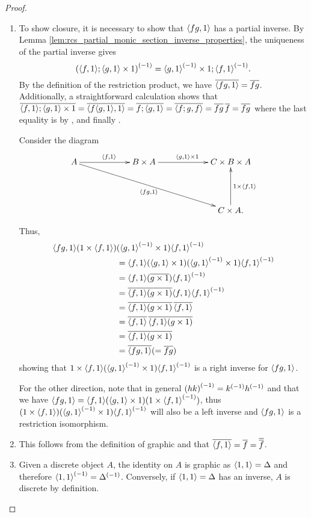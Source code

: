 \begin{proof}
  \prepprooflist
  \begin{enumerate}[{(}i{)}]
    \item To show closure, it is necessary to show that $\langle f g,1\rangle$ has a partial inverse.
      By Lemma \ref{lem:rcs_partial_monic_section_inverse_properties}, the uniqueness of the
      partial inverse gives
      \[
        {(\langle f,1\rangle ; \langle g,1\rangle\times 1)}^{(-1)} = {\langle g,1\rangle}^{(-1)} \times 1 ; {\langle f,1\rangle}^{(-1)} .
      \]
      By the definition of the restriction product, we have $\overline{\langle f g,1\rangle} = \overline{f g}$. Additionally,
      a straightforward calculation shows that
        $\overline{\langle f,1\rangle;\langle g,1\rangle \times 1} =
          \overline{\langle f\langle g,1\rangle, 1\rangle} = \overline{f ;\langle g,1\rangle}
          = \overline{\langle f;g, f\rangle} = \overline{f g}\,\overline{f} = \overline{f g}
        $
      where the last equality is by \rtwo, \rthree and finally \rone.

    Consider the diagram
    \[
      \xymatrix @C+35pt @R+20pt{
        A \ar[r]^{\<f,1\>} \ar[drr]_{\<f g,1\>} &
           B \times A  \ar[r]^{\<g,1\> \times 1}
           &  C \times B \times A \\
        &&C \times A. \ar[u]_{1 \times \<f,1\>}
      }
    \]

    Thus,
    \begin{align*}
      \langle f g,1\rangle  (1\times \langle f,1\rangle) &( {\langle g,1\rangle}^{(-1)}\times 1) {\langle f,1\rangle}^{(-1)}\\
      &=\langle f,1\rangle(\langle g,1\rangle\times 1 ) ({\langle g,1\rangle}^{(-1)}\times 1) {\langle f,1\rangle}^{(-1)}\\
      &=\langle f,1\rangle (\overline{g\times 1}) {\langle f,1\rangle}^{(-1)}\\
      &=\overline{\langle f,1\rangle (g\times 1)}  \langle f,1\rangle {\langle f,1\rangle}^{(-1)}\\
      &=\overline{\langle f,1\rangle (g\times 1)}\,  \overline{\langle f,1\rangle}\\
      &= \overline{\langle f,1\rangle}\, \overline{\langle f,1\rangle(g\times 1)}\\
      &= \overline{\langle f,1\rangle (g\times 1)}\\
      &= \overline{\langle f g,1\rangle}(=\overline{f g})\\
    \end{align*}
    showing that $1\times \langle f,1\rangle  ({\langle g,1\rangle}^{(-1)}\times 1 ) {\langle f,1\rangle}^{(-1)}$ is
    a right inverse for $\langle f g,1\rangle$.

    For the other direction, note that in general ${(h k)}^{(-1)} = {k}^{(-1)}{h}^{(-1)}$ and that
    we have $\langle f g,1\rangle = \langle f,1\rangle (\langle g,1\rangle\times 1)  (1 \times {\langle f,1\rangle}^{(-1)})$, thus
    $(1\times \langle f,1\rangle)  ({\langle g,1\rangle}^{(-1)}\times 1) {\langle f,1\rangle}^{(-1)}$ will also be a left inverse and
    $\langle f g,1\rangle$ is a restriction isomorphism.

    \item This follows from the definition of graphic and that
       $\overline{\langle f,1\rangle} = \overline{f} = \overline{\overline{f}}$.

    \item Given a discrete object $A$, the identity on $A$ is graphic as $\langle1,1\rangle = \Delta$
      and therefore ${\langle1,1\rangle}^{(-1)} = {\Delta}^{(-1)}$. Conversely, if $\langle1,1\rangle = \Delta$ has an
      inverse, $A$ is discrete by definition.
  \end{enumerate}
\end{proof}

